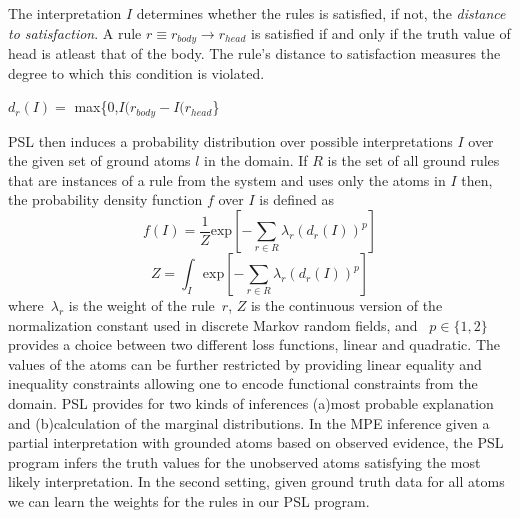 The interpretation $\mathit{I}$ determines whether the rules is satisfied, if not, the \emph{distance to satisfaction}.
A rule $\mathit{r} \equiv \mathit{r_{body}} \rightarrow \mathit{r_{head}} $  is satisfied if and only if the truth value of head is atleast that of the body. The rule's distance to satisfaction measures the degree to which this condition is violated.
 \newline
\begin{center} 
 $\mathit{d_r}(\mathit{I}) =$ max\{0,$\mathit{I(r_{body}} - \mathit{I(r_{head}}$\}
 \end{center}

PSL then induces a probability distribution over possible interpretations $\mathit{I}$ over the given set of ground atoms $\mathit{l} $ in the domain. 
If $\mathit{R}$ is the set of all ground rules that are instances of a rule from the system and uses only the atoms in  $\mathit{I}$ then,
the probability density function $\mathit{f}$ over $\mathit{I}$ is defined as
\begin{equation}
\label{eq:contimn1}
    f (I) = \frac{1}{Z} \text{exp}[-\sum_{r\in R} \lambda_r (d_r(I))^p]
\end{equation}
\begin{equation}
\label{eq:contimn2}
	Z = \int_{I} \text{exp} [ -\sum_{r\in R} \lambda_r (d_r(I))^p ]
\end{equation}
where~$\lambda_r$ is the weight of the rule~$r$, $Z$ is the continuous version of the normalization constant used in discrete Markov random fields, and ~$p \in \{1, 2\}$ provides a choice between two different loss functions, linear and quadratic.
The values of the atoms can be further restricted by providing linear equality and inequality constraints allowing one to encode functional constraints from the domain. 
PSL provides for two kinds of inferences (a)most probable explanation and (b)calculation of the marginal distributions. 
In the MPE inference given a partial interpretation with grounded atoms based on observed evidence, the PSL program infers the truth values for the unobserved atoms satisfying the most likely interpretation. 
In the second setting, given ground truth data for all atoms we can learn the weights for the rules in our PSL program.
